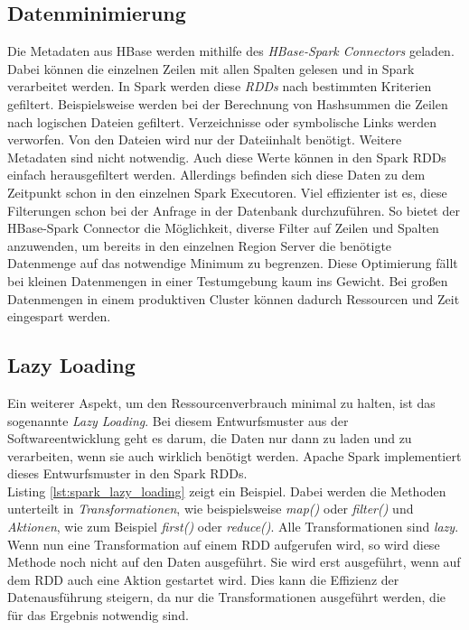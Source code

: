 \subsection*{Datenminimierung}
Die Metadaten aus HBase werden mithilfe des \textit{HBase-Spark Connectors} geladen. Dabei können die einzelnen Zeilen mit allen Spalten gelesen und in Spark verarbeitet werden. In Spark werden diese \textit{RDDs} nach bestimmten Kriterien gefiltert. Beispielsweise werden bei der Berechnung von Hashsummen die Zeilen nach logischen Dateien gefiltert. Verzeichnisse oder symbolische Links werden verworfen. 
Von den Dateien wird nur der Dateiinhalt benötigt. Weitere Metadaten sind nicht notwendig. Auch diese Werte können in den Spark RDDs einfach herausgefiltert werden. Allerdings befinden sich diese Daten zu dem Zeitpunkt schon in den einzelnen Spark Executoren. Viel effizienter ist es, diese Filterungen schon bei der Anfrage in der Datenbank durchzuführen. So bietet der HBase-Spark Connector die Möglichkeit, diverse Filter auf Zeilen und Spalten anzuwenden, um bereits in den einzelnen Region Server die benötigte Datenmenge auf das notwendige Minimum zu begrenzen. Diese Optimierung fällt bei kleinen Datenmengen in einer Testumgebung kaum ins Gewicht. Bei großen Datenmengen in einem produktiven Cluster können dadurch Ressourcen und Zeit eingespart werden.

\subsection*{Lazy Loading}
Ein weiterer Aspekt, um den Ressourcenverbrauch minimal zu halten, ist das sogenannte \textit{Lazy Loading}. Bei diesem Entwurfsmuster aus der Softwareentwicklung geht es darum, die Daten nur dann zu laden und zu verarbeiten, wenn sie auch wirklich benötigt werden. Apache Spark implementiert dieses Entwurfsmuster in den Spark RDDs.\cite{spark_rdd}\\
Listing \ref{lst:spark_lazy_loading} zeigt ein Beispiel. Dabei werden die Methoden unterteilt in \textit{Transformationen}, wie beispielsweise \textit{map()} oder \textit{filter()} und \textit{Aktionen}, wie zum Beispiel \textit{first()} oder \textit{reduce()}. Alle Transformationen sind \textit{lazy}. Wenn nun eine Transformation auf einem RDD aufgerufen wird, so wird diese Methode noch nicht auf den Daten ausgeführt. Sie wird erst ausgeführt, wenn auf dem RDD auch eine Aktion gestartet wird. Dies kann die Effizienz der Datenausführung steigern, da nur die Transformationen ausgeführt werden, die für das Ergebnis notwendig sind.

